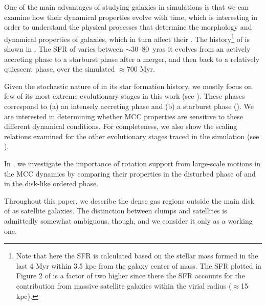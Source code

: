 \IfFileExists{emulateapjlegacy.cls}{\documentclass[iop]{emulateapjlegacy}}{\documentclass[iop]{emulateapj}}
\begin{document}
One of the main advantages of studying galaxies in simulations is that we can examine how their dynamical properties evolve with time, which
is interesting in order to understand the physical processes that determine the morphology and dynamical properties of galaxies, which in turn affect their \SF.
%
The \SF history\footnote{Note that here the SFR is calculated based on the stellar mass formed in the last 4 Myr within 3.5 kpc from the galaxy center of mass. The SFR plotted in Figure 2 of \citet{Pallottini17b} is a factor of two higher since there the SFR accounts for the contribution from massive satellite galaxies within the virial radius ($\approx$15\,kpc).} of \flower is shown in . The SFR of \flower varies between $\sim$30--80 \Msun\,yr\pmOne as it evolves from an actively accreting phase to a starburst phase after a merger, and then back to a relatively quiescent phase, over the simulated $\approx 700$ Myr.

Given the stochastic nature of \flower in its star formation history, we mostly focus on few of its most extreme evolutionary stages in this work (see ).
%
These phases correspond to (a) an intensely accreting phase and (b) a starburst phase (). We are interested in determining whether MCC properties are sensitive to these different dynamical conditions. For completeness, we also show the scaling relations examined for the other evolutionary stages traced in the simulation (see ).

In , we investigate the importance of rotation support from large-scale motions in the MCC dynamics by comparing their properties
in the disturbed phase of \flower and in the disk-like ordered phase.

Throughout this paper, we describe the dense gas regions outside the main disk of \flower as satellite galaxies. The distinction between clumps and satellites is admittedly somewhat ambiguous, though, and we consider it only as a working one.
\end{document}
